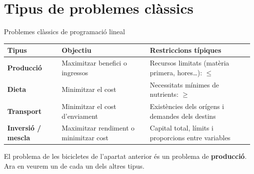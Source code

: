 \documentclass[11pt,a4paper]{article}
\begin{document}
\section{Tipus de problemes clàssics}\hypertarget{sec4}{}

\begin{fmprop}{Problemes clàssics de programació lineal}
\begin{center}\renewcommand{\arraystretch}{1.5}\small\begin{tabularx}{\linewidth}{>{\raggedright\arraybackslash}p{3.2cm}>{\raggedright\arraybackslash}X>{\raggedright\arraybackslash}X}\toprule
\textbf{Tipus} & \textbf{Objectiu} & \textbf{Restriccions típiques}\\\midrule
\textbf{Producció} & Maximitzar benefici o ingressos & Recursos limitats (matèria primera, hores\dots{}): $\leq$\\[3pt]
\textbf{Dieta} & Minimitzar el cost & Necessitats mínimes de nutrients: $\geq$\\[3pt]
\textbf{Transport} & Minimitzar el cost d'enviament & Existències dels orígens i demandes dels destins\\[3pt]
\textbf{Inversió / mescla} & Maximitzar rendiment o minimitzar cost & Capital total, límits i proporcions entre variables\\[3pt]
\bottomrule\end{tabularx}\end{center}

\begin{fmnote}El problema de les bicicletes de l'apartat anterior és un problema de \textbf{producció}. Ara en veurem un de cada un dels altres tipus.\end{fmnote}
\end{fmprop}
\end{document}
